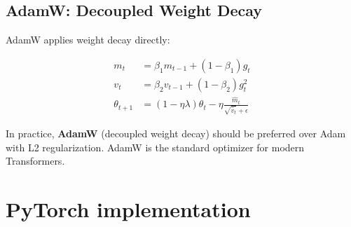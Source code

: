 \subsection{AdamW: Decoupled Weight Decay}

AdamW \cite{loshchilov2019decoupled} applies weight decay directly:
\begin{keyformulas}[title=\textbf{AdamW}]
\begin{align}
m_t &= \beta_1 m_{t-1} + (1 - \beta_1) g_t \\
v_t &= \beta_2 v_{t-1} + (1 - \beta_2) g_t^2 \\
\theta_{t+1} &= (1 - \eta\lambda)\theta_t
               - \eta \frac{\hat{m}_t}{\sqrt{\hat{v}_t} + \epsilon}
\end{align}
\end{keyformulas}

\begin{bestpractice}[title=\textbf{Use AdamW}]
In practice, \textbf{AdamW} (decoupled weight decay) should be
preferred over Adam with L2 regularization. AdamW is the standard
optimizer for modern Transformers.
\end{bestpractice}

\section{PyTorch implementation}
\label{sec:reg-pytorch}

